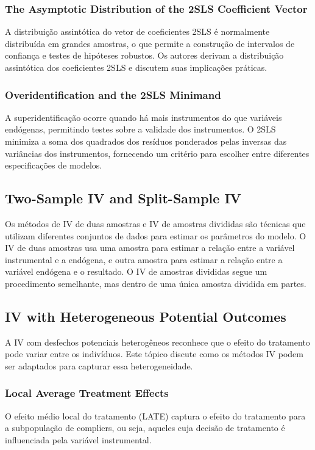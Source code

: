 \documentclass[a4paper,12pt]{article}[abntex2]
\begin{document}
\subsubsection{The Asymptotic Distribution of the 2SLS Coefficient Vector}
A distribuição assintótica do vetor de coeficientes 2SLS é normalmente distribuída em grandes amostras, o que permite a construção de intervalos de confiança e testes de hipóteses robustos. Os autores derivam a distribuição assintótica dos coeficientes 2SLS e discutem suas implicações práticas.

\subsubsection{Overidentification and the 2SLS Minimand}
A superidentificação ocorre quando há mais instrumentos do que variáveis endógenas, permitindo testes sobre a validade dos instrumentos. O 2SLS minimiza a soma dos quadrados dos resíduos ponderados pelas inversas das variâncias dos instrumentos, fornecendo um critério para escolher entre diferentes especificações de modelos.

\subsection{Two-Sample IV and Split-Sample IV}
Os métodos de IV de duas amostras e IV de amostras divididas são técnicas que utilizam diferentes conjuntos de dados para estimar os parâmetros do modelo. O IV de duas amostras usa uma amostra para estimar a relação entre a variável instrumental e a endógena, e outra amostra para estimar a relação entre a variável endógena e o resultado. O IV de amostras divididas segue um procedimento semelhante, mas dentro de uma única amostra dividida em partes.

\subsection{IV with Heterogeneous Potential Outcomes}
A IV com desfechos potenciais heterogêneos reconhece que o efeito do tratamento pode variar entre os indivíduos. Este tópico discute como os métodos IV podem ser adaptados para capturar essa heterogeneidade.

\subsubsection{Local Average Treatment Effects}
O efeito médio local do tratamento (LATE) captura o efeito do tratamento para a subpopulação de compliers, ou seja, aqueles cuja decisão de tratamento é influenciada pela variável instrumental.
\end{document}
